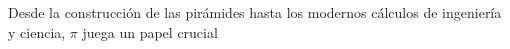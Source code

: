\documentclass[preview]{standalone}
\begin{document}
\begin{center}
Desde la construcción de las pirámides hasta los modernos cálculos de ingeniería y ciencia, $\pi$ juega un papel crucial
\end{center}
\end{document}
